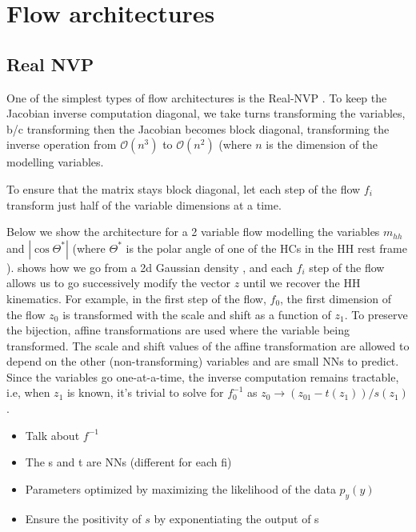 \section{Flow architectures}
\label{app:flows-details}

\subsection{Real NVP}

One of the simplest types of flow architectures is the Real-NVP \cite{1605.08803}. 
To keep the Jacobian inverse computation diagonal, we take turns transforming the variables, b/c transforming then the Jacobian becomes block diagonal, transforming the inverse operation from $\mathcal{O}(n^3)$ to $\mathcal{O}(n^2)$ (where $n$ is the dimension of the modelling variables.

To ensure that the matrix stays block diagonal, let each step of the flow $f_{i}$ transform just half of the variable dimensions at a time.
 
Below we show the architecture for a  2 variable flow modelling the variables $m_{hh}$ and $|\cos \Theta^*|$ (where $\Theta^*$ is the polar angle of one of the HCs in the HH rest frame \cite{paper from Rafael}). \Fig{\ref{fig:rnvp-graphic}} shows how we go from a 2d Gaussian density , and each $f_i$ step of the flow allows us to go successively modify the vector $z$ until we recover the HH kinematics.
For example, in the first step of the flow, $f_0$, the first dimension of the flow $z_0$ is transformed with the scale and shift as a function of $z_1$. 
To preserve the bijection, affine transformations are used where the variable being transformed.
The scale and shift values of the affine transformation are allowed to depend on the other (non-transforming) variables and are small NNs to predict.
Since the variables go one-at-a-time, the inverse computation remains tractable, i.e, when $z_1$ is known, it's trivial to solve for $f_0^{-1}$ as $z_0 \rightarrow \left( z_01- t(z_1) \right) / s (z_1)$.

\begin{itemize}
	\item Talk about $f^{-1}$
	\item The s and t are NNs (different for each fi) 
	\item Parameters optimized by maximizing the likelihood of the data $p_y(y)$
	\item Ensure the positivity of $s$ by exponentiating the output of s
\end{itemize}

